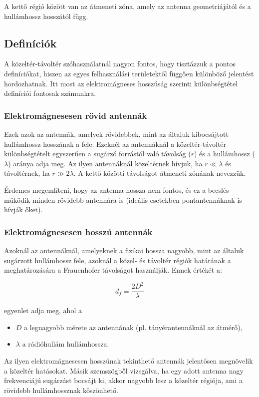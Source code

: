 \documentclass[12pt]{article}
\begin{document}
A kettő régió között van az átmeneti zóna, amely az antenna geometriájától és a 
hullámhossz hosszától függ.

\subsection{Definíciók}
A közeltér-távoltér szóhasználatnál nagyon fontos, hogy tisztázzuk a pontos
definíciókat, hiszen az egyes felhasználási területektől függően különböző
jelentést hordozhatnak. Itt most az elektromágneses hosszúság szerinti különbségtétel
definíciói fontosak számunkra.

\subsubsection{Elektromágnesesen rövid antennák}
Ezek azok az antennák, amelyek rövidebbek, mint az általuk kibocsájtott hullámhossz
hosszának a fele. Ezeknél az antennáknál a közeltér-távoltér különbségtételt egyszerűen
a sugárzó forrástól való távolság ($r$) és a hullámhossz ($\lambda$) aránya adja meg.
Az ilyen antennáknál közeltérnek hívjuk, ha $ r \ll \lambda $ és távoltérnek, ha $ r \gg 2\lambda $.
A kettő közötti távolságot átmeneti zónának nevezzük.

Érdemes megemlíteni, hogy az antenna hossza nem fontos, és ez a becslés működik minden
rövidebb antennára is (ideális esetekben pontantennáknak is hívják őket).

\subsubsection{Elektromágnesesen hosszú antennák}
Azoknál az antennáknál, amelyeknek a fizikai hossza nagyobb, mint az általuk sugárzott
hullámhossz fele, azoknál a közel- és távoltér régiók határának a meghatározására a 
Frauenhofer távolságot használják. Ennek értékét a:

\begin{equation}
d_f = \frac{2D^2}{\lambda}
\end{equation}

egyenlet adja meg, ahol a
\begin{itemize}
\item $D$ a legnagyobb mérete az antennának (pl. tányérantennáknál az átmérő),
\item $\lambda$ a rádióhullám hullámhossza.
\end{itemize} 

Az ilyen elektromágnesesen hosszúnak tekinthető antennák jelentősen megnövelik a
közeltér hatásokat. Másik szemszögből vizsgálva, ha egy adott antenna nagy 
frekvenciájú sugárzást bocsájt ki, akkor nagyobb lesz a közeltér régiója, ami a
rövidebb hullámhossznak köszönhető.
\end{document}
